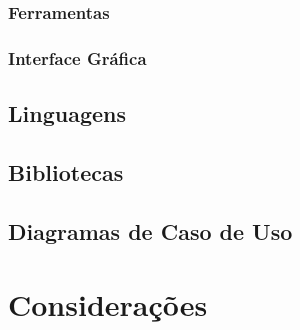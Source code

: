 \subsubsection{Ferramentas}
\subsubsection{Interface Gráfica}
\subsection{Linguagens}
\subsection{Bibliotecas}
\subsection{Diagramas de Caso de Uso}
\section{Considerações}
